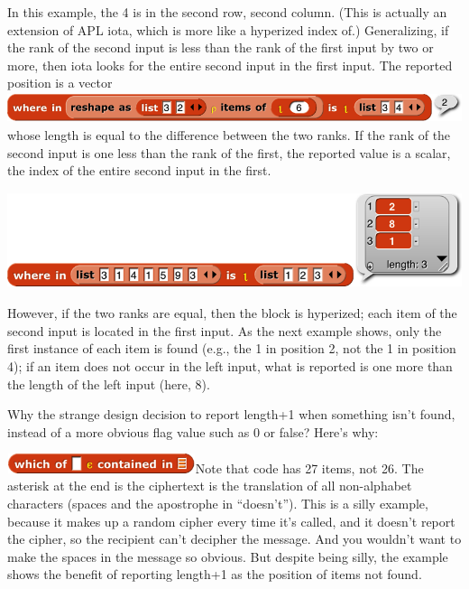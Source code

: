 In this example, the 4 is in the second row, second column. (This is
actually an extension of APL iota, which is more like a hyperized index
of.) Generalizing, if the rank of the second input is less than the rank
of the first input by two or more, then iota looks for the entire second
input in the first input. The reported position is a vector
\includegraphics[width=5.84167in,height=0.35in]{media/image1286.png}whose
length is equal to the difference between the two ranks. If the rank of
the second input is one less than the rank of the first, the reported
value is a scalar, the index of the entire second input in the first.

\includegraphics[width=5.38333in,height=1.1in]{media/image1287.png}

However, if the two ranks are equal, then the block is hyperized; each
item of the second input is located in the first input. As the next
example shows, only the first instance of each item is found (e.g., the
1 in position 2, not the 1 in position 4); if an item does not occur in
the left input, what is reported is one more than the length of the left
input (here, 8).

Why the strange design decision to report length+1 when something isn't
found, instead of a more obvious flag value such as 0 or false? Here's
why:

\includegraphics[width=2.175in,height=0.225in]{media/image1292.png}Note
that code has 27 items, not 26. The asterisk at the end is the
ciphertext is the translation of all non-alphabet characters (spaces and
the apostrophe in ``doesn't''). This is a silly example, because it
makes up a random cipher every time it's called, and it doesn't report
the cipher, so the recipient can't decipher the message. And you
wouldn't want to make the spaces in the message so obvious. But despite
being silly, the example shows the benefit of reporting length+1 as the
position of items not found.

